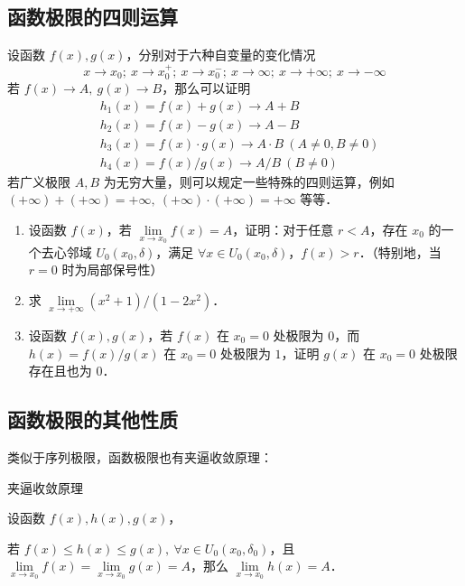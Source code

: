 \subsection{函数极限的四则运算}
设函数 $f(x),g(x)$，分别对于六种自变量的变化情况
\begin{equation}
  x\rightarrow x_0;\ x\rightarrow x_0^+;\ x\rightarrow x_0^{-};\ x\rightarrow \infty;\ x\rightarrow +\infty;\ x\rightarrow -\infty
\end{equation}
  若 $f(x)\rightarrow A,\ g(x)\rightarrow B$，那么可以证明
\begin{equation}
  \begin{aligned}
  &h_1(x)=f(x)+g(x)\rightarrow A+B\\
  &h_2(x)=f(x)-g(x)\rightarrow A-B\\
  &h_3(x)=f(x)\cdot g(x)\rightarrow A\cdot B\ (A\neq 0,B\neq 0)\\
  &h_4(x)=f(x)/ g(x)\rightarrow A/B\ (B\neq 0)
  \end{aligned}
\end{equation}
  若广义极限 $A,B$ 为无穷大量，则可以规定一些特殊的四则运算，例如 $(+\infty)+(+\infty)=+\infty,\ 
  (+\infty)\cdot (+\infty)=+\infty$ 等等．
\begin{exercise}{}
\begin{enumerate}
\item  设函数 $f(x)$，若 $\lim\limits_{x\rightarrow x_0}f(x)=A$，证明：对于任意 $r<A$，存在 $x_0$ 的一个去心邻域 $U_0(x_0,\delta)$，满足 $\forall x\in U_0(x_0,\delta)$，$f(x)>r$．（特别地，当 $r=0$ 时为局部保号性）
\item 求 $\lim\limits_{x\rightarrow +\infty}(x^2+1)/(1-2x^2)$．
\item 设函数 $f(x),g(x)$，若 $f(x)$ 在 $x_0=0$ 处极限为 $0$，而 $h(x)=f(x)/g(x)$ 在 $x_0=0$ 处极限为 $1$，证明 $g(x)$ 在 $x_0=0$ 处极限存在且也为 $0$．
\end{enumerate}

\end{exercise}

\subsection{函数极限的其他性质}
类似于序列极限，函数极限也有夹逼收敛原理：
\begin{theorem}{夹逼收敛原理}

  设函数 $f(x),h(x),g(x)$，

  若 $f(x)\le h(x)\le g(x),\ \forall x\in U_0(x_0,\delta_0)$，且 $\lim\limits_{x\rightarrow x_0}f(x)=\lim\limits_{x\rightarrow x_0} g(x)=A$，那么 $\lim\limits_{x\rightarrow x_0}h(x)=A$．
\end{theorem}

